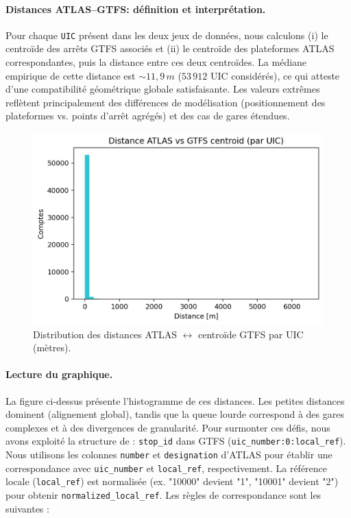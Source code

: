 \paragraph{Distances ATLAS–GTFS: définition et interprétation.} Pour chaque \texttt{UIC} présent dans les deux jeux de données, nous calculons (i) le centroïde des arrêts GTFS associés et (ii) le centroïde des plateformes ATLAS correspondantes, puis la distance entre ces deux centroïdes. La médiane empirique de cette distance est \textbf{\(\sim 11{,}9\,m\)} (\(53\,912\) UIC considérés), ce qui atteste d’une compatibilité géométrique globale satisfaisante. Les valeurs extrêmes reflètent principalement des différences de modélisation (positionnement des plateformes vs. points d’arrêt agrégés) et des cas de gares étendues.

\begin{figure}[h]
  \centering
  \includegraphics[width=.76\linewidth]{figures/plots/atlas_vs_gtfs_distance_hist.png}
  \caption[Distances ATLAS–GTFS par UIC]{Distribution des distances ATLAS \(\leftrightarrow\) centroïde GTFS par UIC (mètres).}
  \label{fig:atlas_gtfs_distance}
\end{figure}

\paragraph{Lecture du graphique.} La figure ci-dessus présente l’histogramme de ces distances. Les petites distances dominent (alignement global), tandis que la queue lourde correspond à des gares complexes et à des divergences de granularité.
Pour surmonter ces défis, nous avons exploité la structure de : \newline
\texttt{stop\_id} dans GTFS (\texttt{uic\_number:0:local\_ref}). \newline
Nous utilisons les colonnes \texttt{number} et \texttt{designation} d’ATLAS pour établir une correspondance avec \texttt{uic\_number} et \texttt{local\_ref}, respectivement. La référence locale (\texttt{local\_ref}) est normalisée (ex. "10000" devient "1", "10001" devient "2") pour obtenir \texttt{normalized\_local\_ref}. Les règles de correspondance sont les suivantes :

